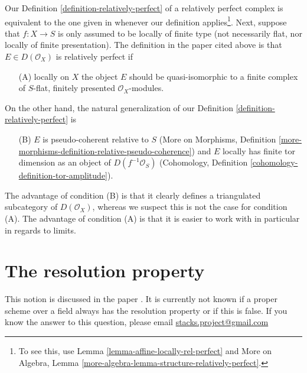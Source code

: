 \begin{remark}
\label{remark-discuss-rel-perfect}
Our Definition \ref{definition-relatively-perfect} of a
relatively perfect complex is equivalent to the one given
in \cite{lieblich-complexes} whenever our definition applies\footnote{To
see this, use Lemma \ref{lemma-affine-locally-rel-perfect} and
More on Algebra, Lemma \ref{more-algebra-lemma-structure-relatively-perfect}.}.
Next, suppose that $f : X \to S$ is only assumed to be locally
of finite type (not necessarily flat, nor locally of finite
presentation). The definition in the paper cited above is that
$E \in D(\mathcal{O}_X)$ is relatively perfect if
\begin{enumerate}
\item[(A)] locally on $X$ the object $E$ should be
quasi-isomorphic to a finite complex of
$S$-flat, finitely presented $\mathcal{O}_X$-modules.
\end{enumerate}
On the other hand, the natural generalization of our
Definition \ref{definition-relatively-perfect} is
\begin{enumerate}
\item[(B)] $E$ is pseudo-coherent relative to $S$
(More on Morphisms, Definition
\ref{more-morphisms-definition-relative-pseudo-coherence})
and $E$ locally has finite tor dimension as an object of
$D(f^{-1}\mathcal{O}_S)$
(Cohomology, Definition \ref{cohomology-definition-tor-amplitude}).
\end{enumerate}
The advantage of condition (B) is that it clearly defines a triangulated
subcategory of $D(\mathcal{O}_X)$, whereas we suspect this is not
the case for condition (A). The advantage of condition (A)
is that it is easier to work with in particular in regards to limits.
\end{remark}









\section{The resolution property}
\label{section-resolution-property}

\noindent
This notion is discussed in the paper \cite{totaro_resolution}.
It is currently not known if a proper scheme over a field
always has the resolution property or if this is false.
If you know the answer to this question, please email
\href{mailto:stacks.project@gmail.com}{stacks.project@gmail.com}

